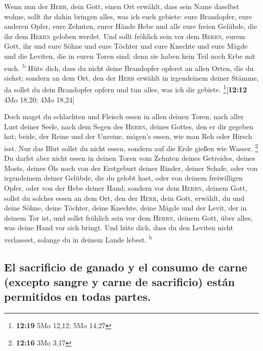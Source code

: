  Wenn nun der \textsc{Herr}, dein Gott, einen Ort
erwählt, dass sein Name daselbst wohne, sollt ihr dahin bringen alles,
was ich euch gebiete: eure Brandopfer, eure anderen Opfer, eure Zehnten,
eurer Hände Hebe und alle eure freien Gelübde, die ihr dem
\textsc{Herrn} geloben werdet.  Und sollt fröhlich sein
vor dem \textsc{Herrn}, eurem Gott, ihr und eure Söhne und eure Töchter
und eure Knechte und eure Mägde und die Leviten, die in euren Toren
sind; denn sie haben kein Teil noch Erbe mit euch. \textsuperscript{b}
 Hüte dich, dass du nicht deine Brandopfer opferst an
allen Orten, die du siehst;  sondern an dem Ort, den der
\textsc{Herr} erwählt in irgendeinem deiner Stämme, da sollst du dein
Brandopfer opfern und tun alles, was ich dir gebiete.
\footnote{\textbf{12:19} 5Mo 12,12; 5Mo 14,27}{[}\textbf{12:12} 4Mo
18,20; 4Mo 18,24{]}

 Doch magst du schlachten und Fleisch essen in allen
deinen Toren, nach aller Lust deiner Seele, nach dem Segen des
\textsc{Herrn}, deines Gottes, den er dir gegeben hat; beide, der Reine
und der Unreine, mögen's essen, wie man Reh oder Hirsch isst.
 Nur das Blut sollst du nicht essen, sondern auf die Erde
gießen wie Wasser. \footnote{\textbf{12:16} 3Mo 3,17}  Du
darfst aber nicht essen in deinen Toren vom Zehnten deines Getreides,
deines Mosts, deines Öls noch von der Erstgeburt deiner Rinder, deiner
Schafe, oder von irgendeinem deiner Gelübde, die du gelobt hast, oder
von deinem freiwilligen Opfer, oder von der Hebe deiner Hand;
 sondern vor dem \textsc{Herrn}, deinem Gott, sollst du
solches essen an dem Ort, den der \textsc{Herr}, dein Gott, erwählt, du
und deine Söhne, deine Töchter, deine Knechte, deine Mägde und der
Levit, der in deinem Tor ist, und sollst fröhlich sein vor dem
\textsc{Herrn}, deinem Gott, über alles, was deine Hand vor sich bringt.
 Und hüte dich, dass du den Leviten nicht verlassest,
solange du in deinem Lande lebest. \textsuperscript{b}

\hypertarget{el-sacrificio-de-ganado-y-el-consumo-de-carne-excepto-sangre-y-carne-de-sacrificio-estuxe1n-permitidos-en-todas-partes.}{%
\subsection{El sacrificio de ganado y el consumo de carne (excepto
sangre y carne de sacrificio) están permitidos en todas
partes.}\label{el-sacrificio-de-ganado-y-el-consumo-de-carne-excepto-sangre-y-carne-de-sacrificio-estuxe1n-permitidos-en-todas-partes.}}

